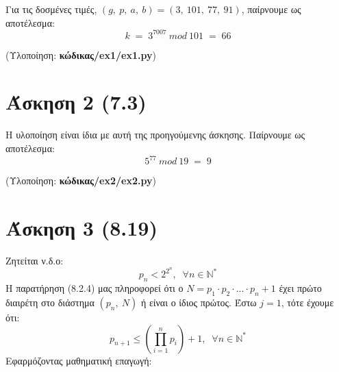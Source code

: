 \documentclass[12pt]{article}
\newcommand{\lt}{\latintext}
\begin{document}
\noindent
Για τις δοσμένες τιμές, $(g,\:p,\:a,\:b) = (3,\:101,\:77,\:91)$, 
παίρνουμε ως αποτέλεσμα: 
\[
k\; = \; 3^{7007}\:mod\:101\; = \; 66
\]

\vspace{0.1in}
\noindent
(Υλοποίηση: \textbf{κώδικας/{\lt ex1/ex1.py}})

\section*{Άσκηση 2 (7.3)}

Η υλοποίηση είναι ίδια με αυτή της προηγούμενης άσκησης. Παίρνουμε ως αποτέλεσμα: 
\[
5^{77}\: mod\: 19 \; = \; 9
\]

\vspace{0.1in}
\noindent
(Υλοποίηση: \textbf{κώδικας/{\lt ex2/ex2.py}})

\section*{Άσκηση 3 (8.19)}

Ζητείται ν.δ.ο:
{ \large
\[
	p_n < 2^{2^n},\;\; \forall n \in \mathbb{N}^{*} \tag{1}
\]
}
Η παρατήρηση (8.2.4) μας πληροφορεί ότι ο 
$N = p_1 \cdot p_2 \cdot ... \cdot p_n + 1$ έχει πρώτο 
διαιρέτη στο διάστημα $(p_n,\:N)$ ή είναι ο ίδιος πρώτος. 
Έστω $j = 1$, τότε έχουμε ότι:
{ \large
\[
p_{n+1} \leq \left(\prod_{i=1}^{n}p_i \right) + 1,\;\; \forall n \in \mathbb{N}^{*}	\tag{2}
\]
}
Εφαρμόζοντας μαθηματική επαγωγή:
\end{document}
